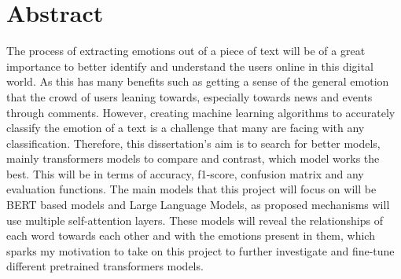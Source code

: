 
\chapter*{Abstract}

The process of extracting emotions out of a piece of text will be of a great importance to better identify and understand the users online in this digital world. As this has many benefits such as getting a sense of the general emotion that the crowd of users leaning towards, especially towards news and events through comments. However, creating machine learning algorithms to accurately classify the emotion of a text is a challenge that
many are facing with any classification. Therefore, this dissertation's aim is to search for better models, mainly transformers models to compare and contrast,
which model works the best. This will be in terms of accuracy, f1-score, confusion matrix and any evaluation functions. The main models that this project will focus on will be BERT based models and Large Language Models, as proposed mechanisms will use multiple self-attention layers. These models will reveal the relationships of each word towards each other and with the emotions present in them, which sparks my motivation to take on this project to further investigate and fine-tune different pretrained transformers models.